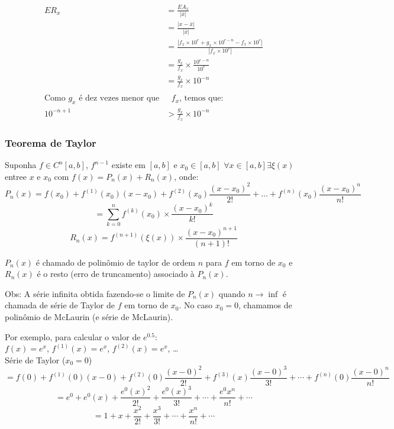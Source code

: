 \documentclass{article}
\begin{document}
            \begin{align*}
                {ER}_x &= \frac{{EA}_x}{|\overline{x}|}\\
                &= \frac{|x - \overline{x}|}{|\overline{x}|}\\
                &= \frac{|f_x \times 10^e + g_x \times 10^{e-n} - f_x \times 10^e|}{|f_x \times 10^e|}\\
                &= \frac{g_x}{f_x} \times \frac{10^{e-n}}{10^e}\\
                &= \frac{g_x}{f_x} \times 10^{-n}\\
                \\
                \text{Como $g_x$ é dez vezes menor que}& \text{ $f_x$, temos que:}\\
                10^{-n + 1} &> \frac{g_x}{f_x} \times 10^{-n}
            \end{align*}


        \subsubsection{Teorema de Taylor}

            Suponha $f \in C^n[a,b]$, $f^{n-1}$ existe em $[a,b]$ e $x_0 \in [a,b]$
            $\forall x \in [a,b] \exists \xi(x)$ entree $x$ e $x_0$ com
            $f(x) = P_n(x) + R_n(x)$, onde:
            \[P_n(x) = f(x_0) + f^{(1)}(x_0)(x - x_0) + f^{(2)}(x_0)\frac{(x-x_0)^2}{2!} + \ldots + f^{(n)}(x_0)\frac{(x-x_0)^n}{n!}\]
            \[= \sum_{k=0}^{n} f^{(k)}(x_0) \times \frac{{(x - x_0)}^k}{k!}\]
            \[R_n(x) = f^{(n+1)}(\xi(x)) \times \frac{{(x - x_0)}^{n+1}}{(n + 1)!}\]


            $P_n(x)$ é chamado de polinômio de taylor de ordem $n$ para $f$ em torno de $x_0$ e $R_n(x)$ é o resto (erro de truncamento) associado à $P_n(x)$.

            Obs: A série infinita obtida fazendo-se o limite de $P_n(x)$ quando $n \rightarrow \inf$ é chamada de série de Taylor de $f$ em torno de $x_0$. No caso $x_0 = 0$, chamamos de polinômio de McLaurin (e série de McLaurin).

            Por exemplo, para calcular o valor de $e^{0.5}$:\\
            $f(x) = e^x$, $f^{(1)}(x) = e^x$, $f^{(2)}(x) = e^x$, \ldots~\\

            Série de Taylor ($x_0 = 0$)
            \[= f(0) + f^{(1)}(0)(x - 0) + f^{(2)}(0)\frac{(x - 0)^2}{2!} + f^{(3)}(x)\frac{(x - 0)^3}{3!} + \cdots + f^{(n)}(0)\frac{(x-0)^n}{n!}\]
            \[= e^0 + e^0(x) + \frac{e^0(x)^2}{2!} + \frac{e^0(x)^3}{3!} + \cdots + \frac{e^0x^n}{n!} + \cdots\]
            \[= 1 + x + \frac{x^2}{2!} + \frac{x^3}{3!} + \cdots + \frac{x^n}{n!} + \cdots\]
\end{document}
